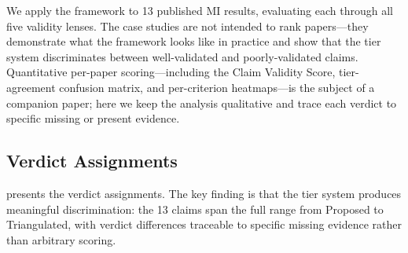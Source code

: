 \documentclass[10pt]{article}
\begin{document}
We apply the framework to 13 published MI results, evaluating each through all five validity lenses. The case studies are not intended to rank papers---they demonstrate what the framework looks like in practice and show that the tier system discriminates between well-validated and poorly-validated claims. Quantitative per-paper scoring---including the Claim Validity Score, tier-agreement confusion matrix, and per-criterion heatmaps---is the subject of a companion paper; here we keep the analysis qualitative and trace each verdict to specific missing or present evidence.

\subsection{Verdict Assignments}

 presents the verdict assignments. The key finding is that the tier system produces meaningful discrimination: the 13 claims span the full range from Proposed to Triangulated, with verdict differences traceable to specific missing evidence rather than arbitrary scoring.
\end{document}
